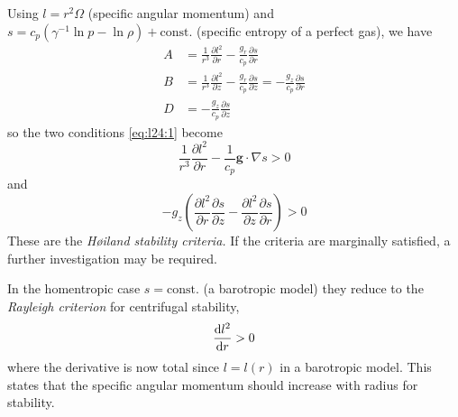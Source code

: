 \documentclass{jknotes}
\begin{document}
Using $l = r^2 \Omega$ (specific angular momentum) and $s = c_p(\gamma^{-1}\ln
p - \ln \rho) + \text{const.}$ (specific entropy of a perfect gas), we have
\begin{align}
	A &= \frac{1}{r^3} \frac{\partial l^2}{\partial r} -
	\frac{g_r}{c_p}\frac{\partial s}{\partial r} \\
	B &= \frac{1}{r^3}\frac{\partial l^2}{\partial z} -
	\frac{g_r}{c_p}\frac{\partial s}{\partial z} =
	-\frac{g_z}{c_p}\frac{\partial s}{\partial r} \\
	D &= -\frac{g_z}{c_p}\frac{\partial s}{\partial z}
\end{align}
so the two conditions \eqref{eq:l24:1} become
\begin{equation}
	\frac{1}{r^3}\frac{\partial l^2}{\partial r} -
	\frac{1}{c_p}\symbf{g}\cdot\nabla s > 0
\end{equation}
and
\begin{equation}
	-g_z\left(\frac{\partial l^2}{\partial r} \frac{\partial s}{\partial z} -
	\frac{\partial l^2}{\partial z} \frac{\partial s}{\partial r}\right) > 0
\end{equation}
These are the \emph{H\o iland stability criteria.} If the criteria are
marginally satisfied, a further investigation may be required.

In the homentropic case $s = \text{const.}$ (a barotropic model) they reduce
to the \emph{Rayleigh criterion} for centrifugal stability,
\begin{equation}
	\frac{\diffd l^2}{\diffd r} > 0
\end{equation}
where the derivative is now total since $l = l(r)$ in a barotropic model. This
states that the specific angular momentum should increase with radius for
stability.
\end{document}
